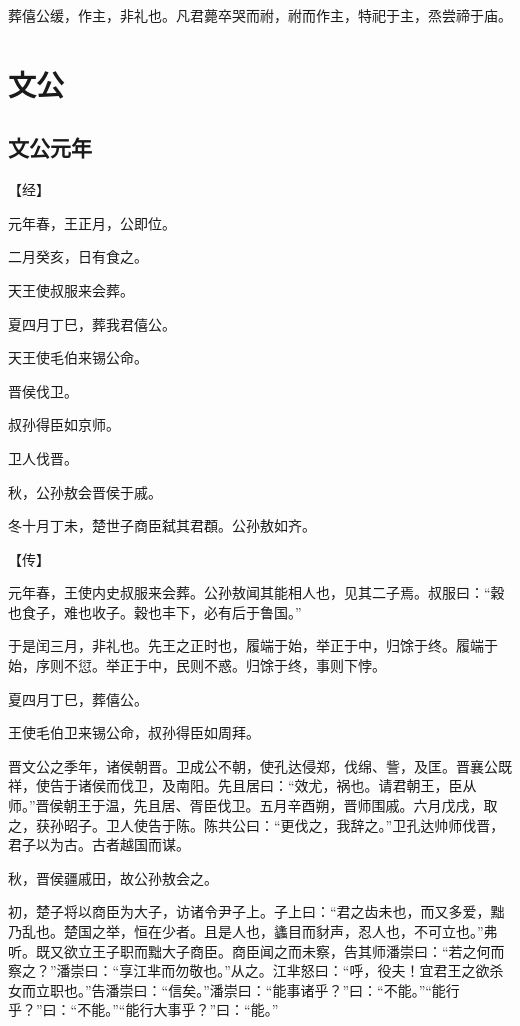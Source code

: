 \documentclass[a4paper,12pt,UTF8,twoside]{ctexbook}
\begin{document}
葬僖公缓，作主，非礼也。凡君薨卒哭而祔，祔而作主，特祀于主，烝尝禘于庙。


\part{文公}

\chapter{文公元年}



【经】

元年春，王正月，公即位。

二月癸亥，日有食之。

天王使叔服来会葬。

夏四月丁巳，葬我君僖公。

天王使毛伯来锡公命。

晋侯伐卫。

叔孙得臣如京师。

卫人伐晋。

秋，公孙敖会晋侯于戚。

冬十月丁未，楚世子商臣弑其君頵。公孙敖如齐。

【传】

元年春，王使内史叔服来会葬。公孙敖闻其能相人也，见其二子焉。叔服曰：“穀也食子，难也收子。穀也丰下，必有后于鲁国。”

于是闰三月，非礼也。先王之正时也，履端于始，举正于中，归馀于终。履端于始，序则不愆。举正于中，民则不惑。归馀于终，事则下悖。

夏四月丁巳，葬僖公。

王使毛伯卫来锡公命，叔孙得臣如周拜。

晋文公之季年，诸侯朝晋。卫成公不朝，使孔达侵郑，伐绵、訾，及匡。晋襄公既祥，使告于诸侯而伐卫，及南阳。先且居曰：“效尤，祸也。请君朝王，臣从师。”晋侯朝王于温，先且居、胥臣伐卫。五月辛酉朔，晋师围戚。六月戊戌，取之，获孙昭子。卫人使告于陈。陈共公曰：“更伐之，我辞之。”卫孔达帅师伐晋，君子以为古。古者越国而谋。

秋，晋侯疆戚田，故公孙敖会之。

初，楚子将以商臣为大子，访诸令尹子上。子上曰：“君之齿未也，而又多爱，黜乃乱也。楚国之举，恒在少者。且是人也，蠭目而豺声，忍人也，不可立也。”弗听。既又欲立王子职而黜大子商臣。商臣闻之而未察，告其师潘崇曰：“若之何而察之？”潘崇曰：“享江芈而勿敬也。”从之。江芈怒曰：“呼，役夫！宜君王之欲杀女而立职也。”告潘崇曰：“信矣。”潘崇曰：“能事诸乎？”曰：“不能。”“能行乎？”曰：“不能。”“能行大事乎？”曰：“能。”
\end{document}
